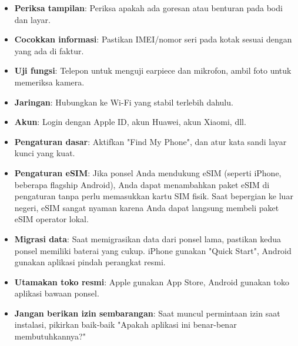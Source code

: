 

\begin{itemize}
  \item \textbf{Periksa tampilan}: Periksa apakah ada goresan atau benturan pada bodi dan layar.
  \item \textbf{Cocokkan informasi}: Pastikan IMEI/nomor seri pada kotak sesuai dengan yang ada di faktur.
  \item \textbf{Uji fungsi}: Telepon untuk menguji earpiece dan mikrofon, ambil foto untuk memeriksa kamera.
\end{itemize}


\begin{itemize}
  \item \textbf{Jaringan}: Hubungkan ke Wi-Fi yang stabil terlebih dahulu.
  \item \textbf{Akun}: Login dengan Apple ID, akun Huawei, akun Xiaomi, dll.
  \item \textbf{Pengaturan dasar}: Aktifkan "Find My Phone", dan atur kata sandi layar kunci yang kuat.
  \item \textbf{Pengaturan eSIM}: Jika ponsel Anda mendukung eSIM (seperti iPhone, beberapa flagship Android), Anda dapat menambahkan paket eSIM di pengaturan tanpa perlu memasukkan kartu SIM fisik. Saat bepergian ke luar negeri, eSIM sangat nyaman karena Anda dapat langsung membeli paket eSIM operator lokal.
  \item \textbf{Migrasi data}: Saat memigrasikan data dari ponsel lama, pastikan kedua ponsel memiliki baterai yang cukup. iPhone gunakan "Quick Start", Android gunakan aplikasi pindah perangkat resmi.
\end{itemize}


\begin{itemize}
  \item \textbf{Utamakan toko resmi}: Apple gunakan App Store, Android gunakan toko aplikasi bawaan ponsel.
  \item \textbf{Jangan berikan izin sembarangan}: Saat muncul permintaan izin saat instalasi, pikirkan baik-baik "Apakah aplikasi ini benar-benar membutuhkannya?"
\end{itemize}

